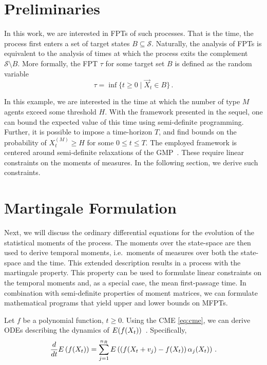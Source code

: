\section{Preliminaries}\label{sec:mfpt:bg}

In this work, we are interested in \acfp{FPT} of such processes.
That is the time, the process first enters a set of target states
$B\subseteq \mathcal{S}$. Naturally, the analysis of \acp{FPT} is
equivalent
to the analysis of times at which the process exits the complement
$\mathcal{S}\setminus B$.
More formally, the \acl{FPT} $\tau$ for
some target set $B$ is defined as the random variable
\begin{equation}\label{eq:fpt_def}
  \tau = \inf\{t\geq 0\mid \vec X_t \in B\}\,.
\end{equation}

In this example, we are interested in the time at which the number of
type $M$ agents
exceed some threshold $H$.
With the framework presented in the sequel, one can bound the expected value
of this time using semi-definite programming.
Further, it is possible to impose a time-horizon $T$, and find bounds
on the probability of $ X_t^{(M)}\geq H$ for some $0\leq t\leq T$.
The employed framework is centered around semi-definite relaxations
of the \ac{GMP}~\parencite{lasserre2010moments}.
These require linear constraints on the moments of measures.
In the following section, we derive such constraints.

\section{Martingale Formulation}\label{sec:mfpt:moments}
Next, we will discuss the ordinary differential equations for the
evolution of the statistical moments of
the process.
The moments over the state-space are then used to derive temporal
moments, i.e.\ moments
of measures over both the state-space and the time.
This extended description results in a process with the martingale property.
This property can be used to formulate linear constraints on the
temporal moments
and, as a special case, the mean first-passage time.
In combination with semi-definite properties of moment matrices, we
can formulate
mathematical programs that yield upper and lower bounds on \aclp{MFPT}\@.

Let $f$ be a polynomial function, $t\ge0$.
Using the \ac{CME} \eqref{eq:cme}, we can derive \acp{ODE}
describing the dynamics of
${E}(f(X_t))$~\parencite{engblom2006computing}.
Specifically,
\begin{equation}\label{eq:mfpt:mom_ode}
  \frac{d}{dt}{E}\left(f(X_t)\right) = \sum_{j=1}^{n_R}{E}\left(\left(f({X_t +
  v_j}) - f(X_t)\right)\alpha_j(X_t)\right)\,.
\end{equation}

